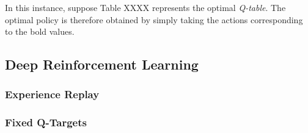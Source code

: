 \documentclass[a4paper]{article}
\begin{document}
\vspace{0.5cm}

In this instance, suppose Table XXXX represents the optimal \textit{Q-table}. The optimal policy is therefore obtained by simply taking the actions corresponding to the bold values.


\subsection{Deep Reinforcement Learning}
\subsubsection{Experience Replay}
\subsubsection{Fixed Q-Targets}

\newpage
\end{document}

